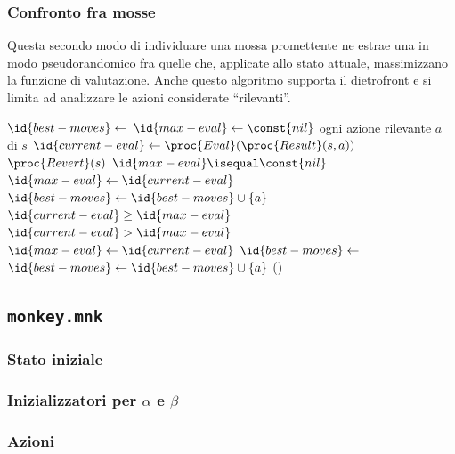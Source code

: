 \documentclass{article}
\begin{document}
\subsubsection{Confronto fra mosse}

Questa secondo modo di individuare una mossa promettente ne estrae una in modo
pseudorandomico fra quelle che, applicate allo stato attuale, massimizzano la
funzione di valutazione. Anche questo algoritmo supporta il dietrofront e si
limita ad analizzare le azioni considerate ``rilevanti''.

\begin{codebox}
  \li  $\id{best-moves} \gets$
       {\emph{}}
  \li  $\id{max-eval} \gets \const{nil}$
  \li \For ogni azione rilevante $a$ di $s$
  \li   \Do
          $\id{current-eval} \gets \proc{Eval}(\proc{Result}(s, a))$
  \li     $\proc{Revert}(s)$
  \li     \If $\id{max-eval} \isequal \const{nil}$
  \li       \Then
              $\id{max-eval} \gets \id{current-eval}$
  \li         $\id{best-moves} \gets \id{best-moves} \cup \{ a \}$
  \li     \ElseIf $\id{current-eval} \geq \id{max-eval}$
  \li       \Then
              \If $\id{current-eval} > \id{max-eval}$
  \li           \Then
                  $\id{max-eval} \gets \id{current-eval}$
  \li             $\id{best-moves} \gets$
                  {\emph{}}
                \End
  \li         $\id{best-moves} \gets \id{best-moves} \cup \{ a \}$
          \End
        \End
  \li  \Return {}()
\end{codebox}

\subsection{\texttt{monkey.mnk}}

\subsubsection{Stato iniziale}

\subsubsection{Inizializzatori per $\alpha$ e $\beta$}

\subsubsection{Azioni} \label{pattern-search}
\end{document}
